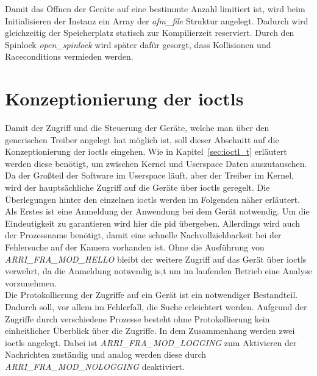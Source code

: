 Damit das Öffnen der Geräte auf eine bestimmte Anzahl limitiert ist, wird beim Initialisieren der Instanz ein Array der \textit{afm\_file} Struktur angelegt. Dadurch wird gleichzeitig der Speicherplatz statisch zur Kompilierzeit reserviert. Durch den Spinlock \textit{open\_spinlock} wird später dafür gesorgt, dass Kollisionen und Raceconditions vermieden werden.


\section{Konzeptionierung der \acl{ioctl}s}\label{sec:ioctl}
Damit der Zugriff und die Steuerung der Geräte, welche man über den generischen Treiber angelegt hat möglich ist, soll dieser Abschnitt auf die Konzeptionierung der \ac{ioctl}s eingehen.
Wie in Kapitel~\ref{sec:ioctl_t} erläutert werden diese benötigt, um zwischen Kernel und Userspace Daten auszutauschen. Da der Großteil der Software im Userspace läuft, aber der Treiber im Kernel, wird der hauptsächliche Zugriff auf die Geräte über \ac{ioctl}s geregelt. Die Überlegungen hinter den einzelnen \ac{ioctl}s werden im Folgenden näher erläutert.\\


Als Erstes ist eine Anmeldung der Anwendung bei dem Gerät notwendig. Um die Eindeutigkeit zu garantieren wird hier die \ac{pid} übergeben. Allerdings wird auch der Prozessname benötigt, damit eine schnelle Nachvollziehbarkeit bei der Fehlersuche auf der Kamera vorhanden ist.
Ohne die Ausführung von \textit{ARRI\_FRA\_MOD\_HELLO} bleibt der weitere Zugriff auf das Gerät über \ac{ioctl}s verwehrt, da die Anmeldung notwendig is,t um im laufenden Betrieb eine Analyse vorzunehmen.\\

Die Protokollierung der Zugriffe auf ein Gerät ist ein notwendiger Bestandteil. Dadurch soll, vor allem im Fehlerfall, die Suche erleichtert werden. Aufgrund der Zugriffe durch verschiedene Prozesse besteht ohne Protokollierung kein einheitlicher Überblick über die Zugriffe.
In dem Zusammenhang werden zwei \ac{ioctl}s angelegt. Dabei ist \textit{ARRI\_FRA\_MOD\_LOGGING} zum Aktivieren der Nachrichten zuständig und analog werden diese durch \textit{ARRI\_FRA\_MOD\_NOLOGGING} deaktiviert. \\

